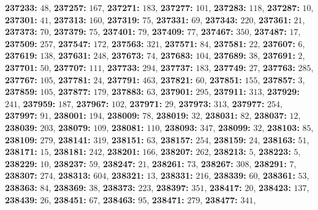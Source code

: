 \textsf{\bfseries 237233:} $48$, \textsf{\bfseries 237257:} $167$, \textsf{\bfseries 237271:} $183$, \textsf{\bfseries 237277:} $101$, \textsf{\bfseries 237283:} $118$, \textsf{\bfseries 237287:} $10$, \textsf{\bfseries 237301:} $41$, \textsf{\bfseries 237313:} $160$, \textsf{\bfseries 237319:} $75$, \textsf{\bfseries 237331:} $69$, \textsf{\bfseries 237343:} $220$, \textsf{\bfseries 237361:} $21$, \textsf{\bfseries 237373:} $70$, \textsf{\bfseries 237379:} $75$, \textsf{\bfseries 237401:} $79$, \textsf{\bfseries 237409:} $77$, \textsf{\bfseries 237467:} $350$, \textsf{\bfseries 237487:} $17$, \textsf{\bfseries 237509:} $257$, \textsf{\bfseries 237547:} $172$, \textsf{\bfseries 237563:} $321$, \textsf{\bfseries 237571:} $84$, \textsf{\bfseries 237581:} $22$, \textsf{\bfseries 237607:} $6$, \textsf{\bfseries 237619:} $138$, \textsf{\bfseries 237631:} $248$, \textsf{\bfseries 237673:} $74$, \textsf{\bfseries 237683:} $104$, \textsf{\bfseries 237689:} $38$, \textsf{\bfseries 237691:} $2$, \textsf{\bfseries 237701:} $50$, \textsf{\bfseries 237707:} $111$, \textsf{\bfseries 237733:} $294$, \textsf{\bfseries 237737:} $183$, \textsf{\bfseries 237749:} $27$, \textsf{\bfseries 237763:} $285$, \textsf{\bfseries 237767:} $105$, \textsf{\bfseries 237781:} $24$, \textsf{\bfseries 237791:} $463$, \textsf{\bfseries 237821:} $60$, \textsf{\bfseries 237851:} $155$, \textsf{\bfseries 237857:} $3$, \textsf{\bfseries 237859:} $105$, \textsf{\bfseries 237877:} $179$, \textsf{\bfseries 237883:} $63$, \textsf{\bfseries 237901:} $295$, \textsf{\bfseries 237911:} $313$, \textsf{\bfseries 237929:} $241$, \textsf{\bfseries 237959:} $187$, \textsf{\bfseries 237967:} $102$, \textsf{\bfseries 237971:} $29$, \textsf{\bfseries 237973:} $313$, \textsf{\bfseries 237977:} $254$, \textsf{\bfseries 237997:} $91$, \textsf{\bfseries 238001:} $194$, \textsf{\bfseries 238009:} $78$, \textsf{\bfseries 238019:} $32$, \textsf{\bfseries 238031:} $82$, \textsf{\bfseries 238037:} $12$, \textsf{\bfseries 238039:} $203$, \textsf{\bfseries 238079:} $109$, \textsf{\bfseries 238081:} $110$, \textsf{\bfseries 238093:} $347$, \textsf{\bfseries 238099:} $32$, \textsf{\bfseries 238103:} $85$, \textsf{\bfseries 238109:} $279$, \textsf{\bfseries 238141:} $319$, \textsf{\bfseries 238151:} $63$, \textsf{\bfseries 238157:} $254$, \textsf{\bfseries 238159:} $24$, \textsf{\bfseries 238163:} $51$, \textsf{\bfseries 238171:} $15$, \textsf{\bfseries 238181:} $242$, \textsf{\bfseries 238201:} $166$, \textsf{\bfseries 238207:} $262$, \textsf{\bfseries 238213:} $5$, \textsf{\bfseries 238223:} $5$, \textsf{\bfseries 238229:} $10$, \textsf{\bfseries 238237:} $59$, \textsf{\bfseries 238247:} $21$, \textsf{\bfseries 238261:} $73$, \textsf{\bfseries 238267:} $308$, \textsf{\bfseries 238291:} $7$, \textsf{\bfseries 238307:} $274$, \textsf{\bfseries 238313:} $604$, \textsf{\bfseries 238321:} $13$, \textsf{\bfseries 238331:} $216$, \textsf{\bfseries 238339:} $60$, \textsf{\bfseries 238361:} $53$, \textsf{\bfseries 238363:} $84$, \textsf{\bfseries 238369:} $38$, \textsf{\bfseries 238373:} $223$, \textsf{\bfseries 238397:} $351$, \textsf{\bfseries 238417:} $20$, \textsf{\bfseries 238423:} $137$, \textsf{\bfseries 238439:} $26$, \textsf{\bfseries 238451:} $67$, \textsf{\bfseries 238463:} $95$, \textsf{\bfseries 238471:} $279$, \textsf{\bfseries 238477:} $341$, 
